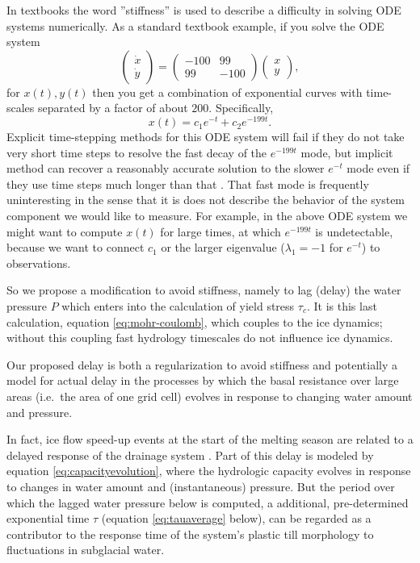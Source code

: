 \documentclass[11pt]{amsart}
\begin{document}
In textbooks the word ''stiffness'' is used to describe a difficulty in solving ODE systems numerically.  As a standard textbook example, if you solve the ODE system
   $$\begin{pmatrix}\dot x \\ \dot y\end{pmatrix}
=  \begin{pmatrix} -100 & 99 \\ 99 & -100\end{pmatrix} 
\begin{pmatrix}x \\ y\end{pmatrix},$$
for $x(t),y(t)$ then you get a combination of exponential curves with time-scales
separated by a factor of about $200$.  Specifically,
   $$x(t) = c_1 e^{-t} + c_2 e^{-199t}.$$
Explicit time-stepping methods for this ODE system will fail if they do not take very short time steps to resolve the fast decay of the $e^{-199t}$ mode, but implicit method can recover a reasonably accurate solution to the slower $e^{-t}$ mode even if they use time steps much longer than that \citep{AscherPetzold}.  That fast mode is frequently uninteresting in the sense that it is does not describe the behavior of the system component we would like to measure.  For example, in the above ODE system we might want to compute $x(t)$ for large times, at which $e^{-199t}$ is undetectable, because we want to connect $c_1$ or the larger eigenvalue ($\lambda_1=-1$ for $e^{-t}$) to observations.

So we propose a modification to avoid stiffness, namely to lag (delay) the water pressure $P$ which enters into the calculation of yield stress $\tau_c$.  It is this last calculation, equation \eqref{eq:mohr-coulomb}, which couples to the ice dynamics; without this coupling fast hydrology timescales do not influence ice dynamics.

Our proposed delay is both a regularization to avoid stiffness and potentially a model for actual delay in the processes by which the basal resistance over large areas (i.e.~the area of one grid cell) evolves in response to changing water amount and pressure.

In fact, ice flow speed-up events at the start of the melting season are related to a delayed response of the drainage system \cite{Schoofmeltsupply, vandeWal2008}.  Part of this delay is modeled by equation \eqref{eq:capacityevolution}, where the hydrologic capacity evolves in response to changes in water amount and (instantaneous) pressure.  But the period over which the lagged water pressure below is computed, a additional, pre-determined exponential time $\tau$ (equation \eqref{eq:tauaverage} below), can be regarded as a contributor to the response time of the system's plastic till morphology to fluctuations in subglacial water.
\end{document}

